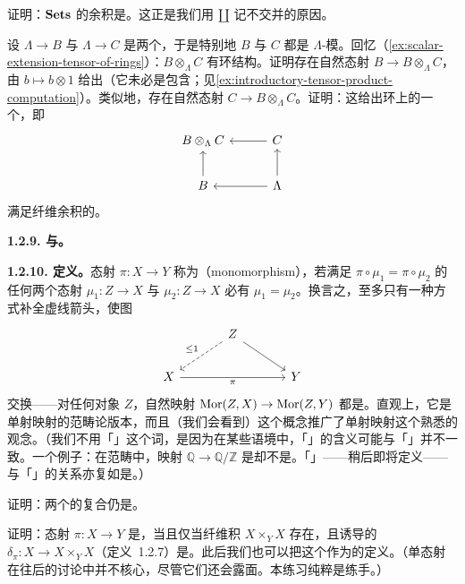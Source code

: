 \begin{exercise}\label{ex:coproducts-disjoint-union}
证明：$\mathbf{Sets}$ 的余积是\trDisjointUnion{}。这正是我们用 $\amalg$ 记不交并的原因。
\end{exercise}

\begin{exercise}\label{ex:rings-tensor-fibered-coproduct}
设 $\Lambda\to B$ 与 $\Lambda\to C$ 是两个\trRingMorphism，于是特别地 $B$ 与 $C$ 都是 $\Lambda$-模。回忆（\cref{ex:scalar-extension-tensor-of-rings}）：$B\otimes_\Lambda C$ 有环结构。证明存在自然态射 $B\to B\otimes_\Lambda C$，由 $b\mapsto b\otimes 1$ 给出（它未必是包含；见\cref{ex:introductory-tensor-product-computation}）。类似地，存在自然态射 $C\to B\otimes_\Lambda C$。证明：这给出环上的一个\trFiberedCoproduct，即
\[
\begin{tikzcd}[row sep=2em, column sep=3em]
B\otimes_\Lambda C & C \ar[l] \\
B \ar[u] & \Lambda \ar[l] \ar[u]
\end{tikzcd}
\]
满足纤维余积的\trUniversalProperty。
\end{exercise}

\textbf{1.2.9. \trMonomorphism{}与\trEpimorphism。}

\textbf{1.2.10. 定义。}\quad 态射 $\pi\colon X\to Y$ 称为\textbf{\trMonomorphism}（monomorphism），若满足 $\pi\circ\mu_1=\pi\circ\mu_2$ 的任何两个态射 $\mu_1\colon Z\to X$ 与 $\mu_2\colon Z\to X$ 必有 $\mu_1=\mu_2$。换言之，至多只有一种方式补全虚线箭头，使图
\[
\begin{tikzcd}[row sep=2em, column sep=3.4em]
 & Z \ar[dl,dashed,"\le 1"'] \ar[dr] & \\
 X \ar[rr,"\pi"'] & & Y
\end{tikzcd}
\]
交换——对任何对象 $Z$，自然映射 $\operatorname{Mor}(Z,X)\to\operatorname{Mor}(Z,Y)$ 都是\trInjection。直观上，它是单射映射的范畴论版本，而且（我们会看到）这个概念推广了单射映射这个熟悉的观念。（我们不用「\trInjectiveMap」这个词，是因为在某些语境中，「\trInjectiveMap」的含义可能与「\trMonomorphism」并不一致。一个例子：在\trDivisibleGroup{}范畴中，映射 $\mathbb{Q}\to\mathbb{Q}/\mathbb{Z}$ 是\trMonomorphism{}却不是\trInjectiveMap{}。「\trEpimorphism」——稍后即将定义——与「\trSurjectiveMap」的关系亦复如是。）

\begin{exercise}\label{ex:composite-of-monomorphisms}
证明：两个\trMonomorphism{}的复合仍是\trMonomorphism。
\end{exercise}

\begin{exercise}\label{ex:monomorphism-diagonal-isomorphism}
证明：态射 $\pi\colon X\to Y$ 是\trMonomorphism，当且仅当纤维积 $X\times_Y X$ 存在，且诱导的\trDiagonalMorphism{} $\delta_\pi\colon X\to X\times_Y X$（定义~1.2.7）是\trIsomorphism。此后我们也可以把这个作为\trMonomorphism{}的定义。（单态射在往后的讨论中并不核心，尽管它们还会露面。本练习纯粹是练手。）
\end{exercise}

